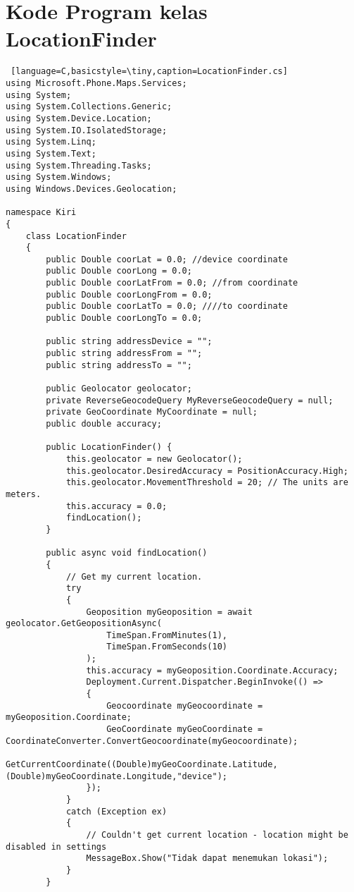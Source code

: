 \chapter{Kode Program kelas LocationFinder}
\label{app:E}

\singlespacing 
%
%

\begin{lstlisting} [language=C,basicstyle=\tiny,caption=LocationFinder.cs]
using Microsoft.Phone.Maps.Services;
using System;
using System.Collections.Generic;
using System.Device.Location;
using System.IO.IsolatedStorage;
using System.Linq;
using System.Text;
using System.Threading.Tasks;
using System.Windows;
using Windows.Devices.Geolocation;

namespace Kiri
{
    class LocationFinder
    {
        public Double coorLat = 0.0; //device coordinate
        public Double coorLong = 0.0;
        public Double coorLatFrom = 0.0; //from coordinate
        public Double coorLongFrom = 0.0;
        public Double coorLatTo = 0.0; ////to coordinate
        public Double coorLongTo = 0.0;

        public string addressDevice = "";
        public string addressFrom = "";
        public string addressTo = "";

        public Geolocator geolocator;
        private ReverseGeocodeQuery MyReverseGeocodeQuery = null;
        private GeoCoordinate MyCoordinate = null;
        public double accuracy;

        public LocationFinder() {
            this.geolocator = new Geolocator();
            this.geolocator.DesiredAccuracy = PositionAccuracy.High;
            this.geolocator.MovementThreshold = 20; // The units are meters.
            this.accuracy = 0.0;
            findLocation();
        }

        public async void findLocation()
        {
            // Get my current location.
            try
            {
                Geoposition myGeoposition = await geolocator.GetGeopositionAsync(
                    TimeSpan.FromMinutes(1),
                    TimeSpan.FromSeconds(10)    
                );
                this.accuracy = myGeoposition.Coordinate.Accuracy;
                Deployment.Current.Dispatcher.BeginInvoke(() =>
                {
                    Geocoordinate myGeocoordinate = myGeoposition.Coordinate;
                    GeoCoordinate myGeoCoordinate = CoordinateConverter.ConvertGeocoordinate(myGeocoordinate);
                    GetCurrentCoordinate((Double)myGeoCoordinate.Latitude, (Double)myGeoCoordinate.Longitude,"device");
                });
            }
            catch (Exception ex)
            {
                // Couldn't get current location - location might be disabled in settings
                MessageBox.Show("Tidak dapat menemukan lokasi");
            }
        }


\end{lstlisting}
